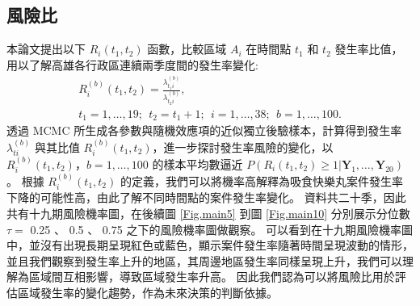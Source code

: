 \documentclass[12pt,a4paper]{article}
\begin{document}
\begin{CJK}{UTF8}{bkai}
\begin{table}
\begin{tabular}{ccccccc}
\hline
\end{tabular}
\label{tab:6}
\end{table}
\noindent


\subsection{風險比}\label{sec:4.4}

本論文提出以下 $R_i(t_1,t_2)$ 函數，比較區域 $A_i$ 在時間點 $t_1$ 和 $t_2$ 發生率比值，用以了解高雄各行政區連續兩季度間的發生率變化:
 \begin{gather*}
 R_i^{(b)}(t_1,t_2) = \frac{\lambda_{t_1i}^{(b)}}{\lambda_{t_2i}^{(b)}}, \\
 t_1 = 1,\dots,19;\:\:t_2 = t_1+1;\:\:i = 1,\dots,38;\:\:b = 1,\dots,100.
 \end{gather*}
\noindent
透過 MCMC 所生成各參數與隨機效應項的近似獨立後驗樣本，計算得到發生率 $\lambda_{ti}^{(b)}$ 與其比值 $R_i^{(b)}(t_1,t_2)$，進一步探討發生率風險的變化，以 $R_i^{(b)}(t_1,t_2) \mbox{，} b = 1,\dots,100$ 的樣本平均數逼近 $P(R_i(t_1,t_2) \ge 1|\bm{Y}_1,\dots,\bm{Y}_{20})$。
根據 $R_i^{(b)}(t_1,t_2)$ 的定義，我們可以將機率高解釋為吸食快樂丸案件發生率下降的可能性高，由此了解不同時間點的案件發生率變化。
資料共二十季，因此共有十九期風險機率圖，在後續圖 \ref{Fig.main5} 到圖 \ref{Fig.main10} 分別展示分位數 $\tau =$ 0.25 、 0.5 、 0.75 之下的風險機率圖做觀察。
可以看到在十九期風險機率圖中，並沒有出現長期呈現紅色或藍色，顯示案件發生率隨著時間呈現波動的情形，並且我們觀察到發生率上升的地區，其周邊地區發生率同樣呈現上升，我們可以理解為區域間互相影響，導致區域發生率升高。
因此我們認為可以將風險比用於評估區域發生率的變化趨勢，作為未來決策的判斷依據。
\\ \hspace*{\fill} \\
\begin{figure}[htpb]
\centering

\end{figure}
\end{CJK}
\end{document}
